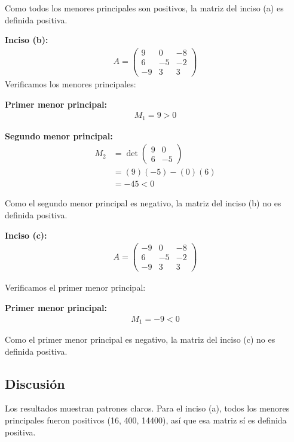 \documentclass{article}
\begin{document}
Como todos los menores principales son positivos, la matriz del inciso (a) es definida positiva.

\textbf{Inciso (b):}
\begin{align}
     A=\begin{pmatrix} 9 & 0 & -8\\ 6 & -5 & -2\\ -9 & 3 & 3 \end{pmatrix}
\end{align}
Verificamos los menores principales:

\textbf{Primer menor principal:}
\begin{align}
M_1 = 9 > 0
\end{align}

\textbf{Segundo menor principal:}
\begin{align}
M_2 &= \det\begin{pmatrix} 9 & 0 \\ 6 & -5 \end{pmatrix} \\
&= (9)(-5) - (0)(6) \\
&= -45 < 0
\end{align}

Como el segundo menor principal es negativo, la matriz del inciso (b) no es definida positiva.

\textbf{Inciso (c):}
\begin{align}
     A=\begin{pmatrix} -9 & 0 & -8\\ 6 & -5 & -2\\ -9 & 3 & 3 \end{pmatrix}
\end{align}

Verificamos el primer menor principal:

\textbf{Primer menor principal:}
\begin{align}
M_1 = -9 < 0
\end{align}

Como el primer menor principal es negativo, la matriz del inciso (c) no es definida positiva.

\subsection{Discusión}

Los resultados muestran patrones claros. Para el inciso (a), todos los menores principales fueron positivos (16, 400, 14400), así que esa matriz sí es definida positiva.
\end{document}
